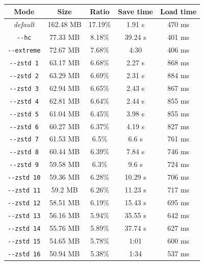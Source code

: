 \documentclass[hidelinks,titlepage,a4paper]{article}
\begin{document}
\begin{table}[h]
\centering
\begin{tabular}[h]{c|c|c|c|c}
\textbf{Mode} & \textbf{Size} & \textbf{Ratio} & \textbf{Save time} & \textbf{Load time} \\ \hline
\emph{default} & 162.48 MB & 17.19\% & 1.91 \si{\second} & 470 \si{\milli\second} \\
\texttt{-{}-hc} & 77.33 MB & 8.18\% & 39.24 \si{\second} & 401 \si{\milli\second} \\
\texttt{-{}-extreme} & 72.67 MB & 7.68\% & 4:30 & 406 \si{\milli\second} \\ \hline
\texttt{-{}-zstd 1} & 63.17 MB & 6.68\% & 2.27 \si{\second} & 868 \si{\milli\second} \\
\texttt{-{}-zstd 2} & 63.29 MB & 6.69\% & 2.31 \si{\second} & 884 \si{\milli\second} \\
\texttt{-{}-zstd 3} & 62.94 MB & 6.65\% & 2.43 \si{\second} & 867 \si{\milli\second} \\
\texttt{-{}-zstd 4} & 62.81 MB & 6.64\% & 2.44 \si{\second} & 855 \si{\milli\second} \\
\texttt{-{}-zstd 5} & 61.04 MB & 6.45\% & 3.98 \si{\second} & 855 \si{\milli\second} \\
\texttt{-{}-zstd 6} & 60.27 MB & 6.37\% & 4.19 \si{\second} & 827 \si{\milli\second} \\
\texttt{-{}-zstd 7} & 61.53 MB & 6.5\% & 6.6 \si{\second} & 761 \si{\milli\second} \\
\texttt{-{}-zstd 8} & 60.44 MB & 6.39\% & 7.84 \si{\second} & 746 \si{\milli\second} \\
\texttt{-{}-zstd 9} & 59.58 MB & 6.3\% & 9.6 \si{\second} & 724 \si{\milli\second} \\
\texttt{-{}-zstd 10} & 59.36 MB & 6.28\% & 10.29 \si{\second} & 706 \si{\milli\second} \\
\texttt{-{}-zstd 11} & 59.2 MB & 6.26\% & 11.23 \si{\second} & 717 \si{\milli\second} \\
\texttt{-{}-zstd 12} & 58.51 MB & 6.19\% & 15.43 \si{\second} & 695 \si{\milli\second} \\
\texttt{-{}-zstd 13} & 56.16 MB & 5.94\% & 35.55 \si{\second} & 642 \si{\milli\second} \\
\texttt{-{}-zstd 14} & 55.76 MB & 5.89\% & 37.74 \si{\second} & 627 \si{\milli\second} \\
\texttt{-{}-zstd 15} & 54.65 MB & 5.78\% & 1:01 & 600 \si{\milli\second} \\
\texttt{-{}-zstd 16} & 50.94 MB & 5.38\% & 1:34 & 537 \si{\milli\second} \\

\end{tabular}
\end{table}
\end{document}
